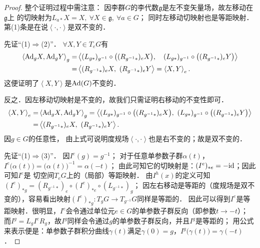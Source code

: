 \begin{proof}
    整个证明过程中需注意：
    因李群$G$的李代数$\mathfrak{g}$是左不变矢量场，故左移动在$\mathfrak{g}$上
    的切映射为$L_{a*} X = X,\  \forall X\in \mathfrak{g},\ \forall a\in G$；
    同时左移动切映射也是等距映射．
    第(1)条是在说$\left<\cdot,\cdot\right>$是双不变的．
    
    先证“(1)$\Rightarrow$(2)”．    $\forall X,Y \in T_e G$有
    \begin{align*}
        \left<{\rm Ad}_{g} X, {\rm Ad}_{g} Y\right>_{g} =& 
        \left<(L_{g*})_{g^{-1}} \circ \bigl((R_{g^{-1}*})_{e} X\bigr) ,\quad 
        (L_{g*})_{g^{-1}} \circ \bigl((R_{g^{-1}*})_{e} Y\bigr)\right> \\
        =& \left<(R_{g^{-1}*})_{e} X,\ (R_{g^{-1}*})_{e} Y \right>
        =\left<X,Y\right>_e .
    \end{align*}
    这便证明了$\left<X,Y\right>$是${\rm Ad}(G)$不变的．
    
    反之．因左移动切映射是不变的，故我们只需证明右移动的不变性即可．
    \begin{align*}
        \left<X,Y\right>_e =& \left<{\rm Ad}_{g} X, {\rm Ad}_{g} Y\right>_{g} 
        =   \left<(L_{g*})_{g^{-1}} \circ \bigl((R_{g^{-1}*})_{e} X\bigr) ,\ 
        (L_{g*})_{g^{-1}} \circ \bigl((R_{g^{-1}*})_{e} Y\bigr)\right> \\
        =&\left<(R_{g^{-1}*})_{e} X,\ (R_{g^{-1}*})_{e} Y \right> .
    \end{align*}
    因$g\in G$的任意性，
    由上式可说明度规场$\left<\cdot,\cdot\right>$也是右不变的；故是双不变的．
    
    
    
    先证“(1)$\Rightarrow$(3)”．
    因$I^e(g)=g^{-1}$；    对于任意单参数子群$\alpha(t)$，
    $I^e\bigl(\alpha(t)\bigr) = \bigl(\alpha(t)\bigr)^{-1}=\alpha(-t)$；
    由此可知它的切映射是：$(I^e)_{*e}=-{\rm id}$；因此可知$I^e$是
    切空间$T_e G$上的（局部）等距映射．
    由$I^h(x)$的定义可知$(I^e)_{*g}= (R_{g^{-1}*})_e \circ (I^e)_{*e}\circ (L_{g^{-1}*})_g$；
    因左右移动是等距的（度规场是双不变的），容易看出映射$(I^e)_{*g}: T_g G \to T_{g^{-1}}G$同样是等距的．
    因此可以得到$I^e$是等距映射．很明显，$I^e$会令通过单位元$e\in G$的单参数子群反向（即参数$t\to -t$）；
    而$I^g=L_g I^e R_g$，故$I^g$同样会令通过$g$的单参数子群反向，并且$I^g$是等距的；
    用公式来表示便是：单参数子群积分曲线$\gamma(t)$满足$\gamma(0)=g$，$I^g\bigl(\gamma(t)\bigr) = \gamma(-t)$．
    

\end{proof}
